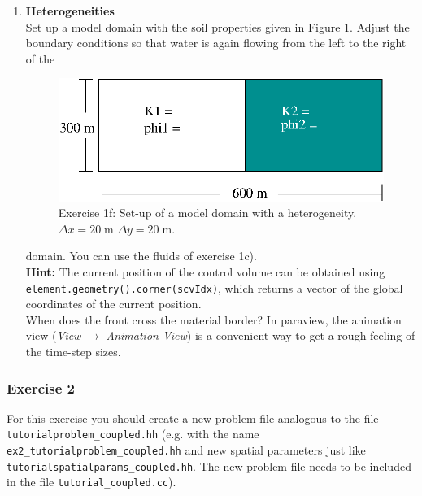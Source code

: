 \begin{enumerate}
\item \textbf{Heterogeneities}  \\
  Set up a model domain with the soil properties given in Figure
  \ref{tutorial-coupled:exercise1_d}. Adjust the boundary conditions
  so that water is again flowing from the left to the right of the
\begin{figure}[ht]
\centering
\includegraphics[width=0.5\linewidth,keepaspectratio]{EPS/exercise1_c.eps}
\caption{Exercise 1f: Set-up of a model domain with a heterogeneity. $\Delta x = 20 \;\text{m}$ $\Delta y = 20\;\text{m}$.}\label{tutorial-coupled:exercise1_d}
\end{figure}
domain. You can use the fluids of exercise 1c).\\
\textbf{Hint:} The current position of the control volume can be obtained using \texttt{element\allowbreak.geometry()\allowbreak.corner(scvIdx)}, which
returns a vector of the global coordinates of the current position.\\
When does the front cross the material border? In paraview, the
animation view (\textit{View} $\rightarrow$ \textit{Animation
  View}) is a convenient way to get a rough feeling of the time-step
sizes.
\end{enumerate}

\subsubsection{Exercise 2}
For this exercise you should create a new problem file analogous to
the file \texttt{tutorialproblem\_coupled.hh} (e.g. with the name
\texttt{ex2\_tutorialproblem\_coupled.hh} and new spatial parameters
just like \texttt{tutorialspatialparams\_coupled.hh}. The new
problem file needs to
be included in the file \texttt{tutorial\_coupled.cc}).

